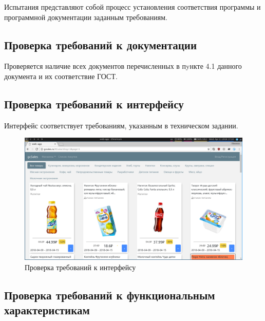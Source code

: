 Испытания представляют собой процесс установления соответствия программы и
программной документации заданным требованиям.

\subsection{Проверка требований к документации}
Проверяется наличие всех документов перечисленных в пyнкте 4.1 данного документа и их соответствие ГОСТ.

\subsection{Проверка требований к интерфейсу}
Интерфейс соответствует требованиям, указанным в техническом задании. 

\begin{figure}[h!]
    \centering
    \includegraphics[width=\textwidth]{./screenshots/interface_main.png}
    \caption{Проверка требований к интерфейсу}
    \label{home}
\end{figure}

\newpage
\subsection{Проверка требований к функциональным характеристикам}
